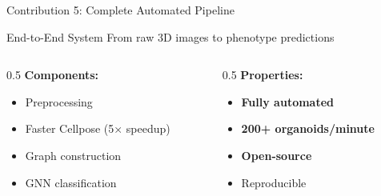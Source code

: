 \documentclass[aspectratio=169]{beamer}
\begin{document}
\begin{frame}{Contribution 5: Complete Automated Pipeline}
    \begin{block}{End-to-End System}
        From raw 3D images to phenotype predictions
    \end{block}
    
    \vspace{0.5em}
    \begin{columns}
        \begin{column}{0.5\textwidth}
            \textbf{Components:}
            \begin{itemize}
                \item Preprocessing
                \item Faster Cellpose (5× speedup)
                \item Graph construction
                \item GNN classification
            \end{itemize}
        \end{column}
        \begin{column}{0.5\textwidth}
            \textbf{Properties:}
            \begin{itemize}
                \item \textbf{Fully automated}
                \item \textbf{200+ organoids/minute}
                \item \textbf{Open-source}
                \item Reproducible
            \end{itemize}
        \end{column}
    \end{columns}
\end{frame}
\end{document}
